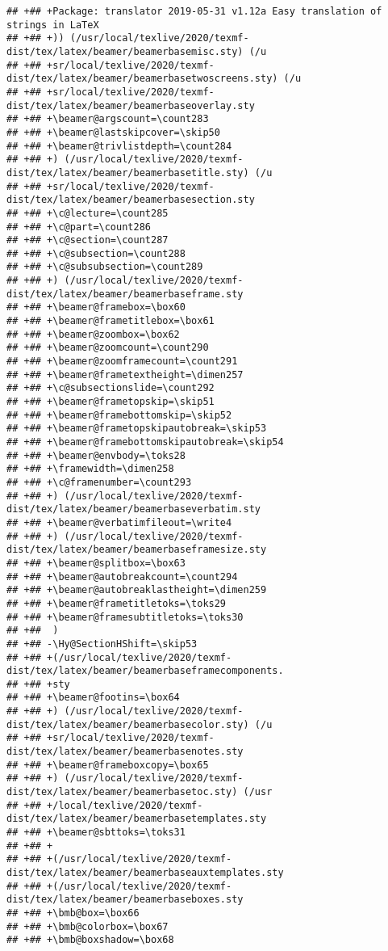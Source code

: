 \documentclass[ignorenonframetext,]{beamer}
\begin{document}
\begin{verbatim}
## +## +Package: translator 2019-05-31 v1.12a Easy translation of strings in LaTeX
## +## +)) (/usr/local/texlive/2020/texmf-dist/tex/latex/beamer/beamerbasemisc.sty) (/u
## +## +sr/local/texlive/2020/texmf-dist/tex/latex/beamer/beamerbasetwoscreens.sty) (/u
## +## +sr/local/texlive/2020/texmf-dist/tex/latex/beamer/beamerbaseoverlay.sty
## +## +\beamer@argscount=\count283
## +## +\beamer@lastskipcover=\skip50
## +## +\beamer@trivlistdepth=\count284
## +## +) (/usr/local/texlive/2020/texmf-dist/tex/latex/beamer/beamerbasetitle.sty) (/u
## +## +sr/local/texlive/2020/texmf-dist/tex/latex/beamer/beamerbasesection.sty
## +## +\c@lecture=\count285
## +## +\c@part=\count286
## +## +\c@section=\count287
## +## +\c@subsection=\count288
## +## +\c@subsubsection=\count289
## +## +) (/usr/local/texlive/2020/texmf-dist/tex/latex/beamer/beamerbaseframe.sty
## +## +\beamer@framebox=\box60
## +## +\beamer@frametitlebox=\box61
## +## +\beamer@zoombox=\box62
## +## +\beamer@zoomcount=\count290
## +## +\beamer@zoomframecount=\count291
## +## +\beamer@frametextheight=\dimen257
## +## +\c@subsectionslide=\count292
## +## +\beamer@frametopskip=\skip51
## +## +\beamer@framebottomskip=\skip52
## +## +\beamer@frametopskipautobreak=\skip53
## +## +\beamer@framebottomskipautobreak=\skip54
## +## +\beamer@envbody=\toks28
## +## +\framewidth=\dimen258
## +## +\c@framenumber=\count293
## +## +) (/usr/local/texlive/2020/texmf-dist/tex/latex/beamer/beamerbaseverbatim.sty
## +## +\beamer@verbatimfileout=\write4
## +## +) (/usr/local/texlive/2020/texmf-dist/tex/latex/beamer/beamerbaseframesize.sty
## +## +\beamer@splitbox=\box63
## +## +\beamer@autobreakcount=\count294
## +## +\beamer@autobreaklastheight=\dimen259
## +## +\beamer@frametitletoks=\toks29
## +## +\beamer@framesubtitletoks=\toks30
## +##  )
## +## -\Hy@SectionHShift=\skip53
## +## +(/usr/local/texlive/2020/texmf-dist/tex/latex/beamer/beamerbaseframecomponents.
## +## +sty
## +## +\beamer@footins=\box64
## +## +) (/usr/local/texlive/2020/texmf-dist/tex/latex/beamer/beamerbasecolor.sty) (/u
## +## +sr/local/texlive/2020/texmf-dist/tex/latex/beamer/beamerbasenotes.sty
## +## +\beamer@frameboxcopy=\box65
## +## +) (/usr/local/texlive/2020/texmf-dist/tex/latex/beamer/beamerbasetoc.sty) (/usr
## +## +/local/texlive/2020/texmf-dist/tex/latex/beamer/beamerbasetemplates.sty
## +## +\beamer@sbttoks=\toks31
## +## +
## +## +(/usr/local/texlive/2020/texmf-dist/tex/latex/beamer/beamerbaseauxtemplates.sty
## +## +(/usr/local/texlive/2020/texmf-dist/tex/latex/beamer/beamerbaseboxes.sty
## +## +\bmb@box=\box66
## +## +\bmb@colorbox=\box67
## +## +\bmb@boxshadow=\box68

\end{verbatim}
\end{document}

